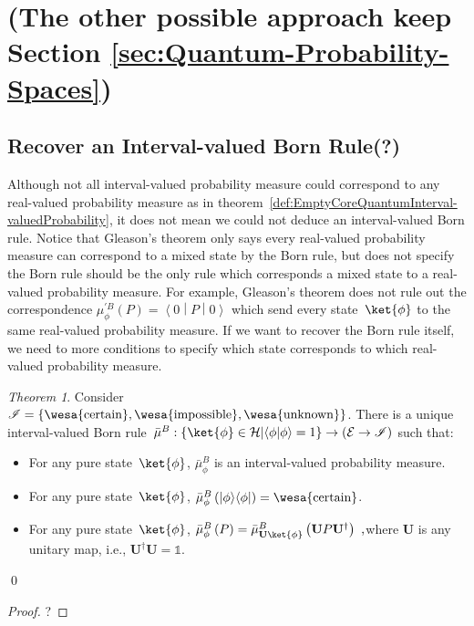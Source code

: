 \documentclass{article}
\theoremstyle{remark}
\newtheorem{thm}{Theorem}
\newcommand{\events}{\ensuremath{\mathcal{E}}}
\newcommand{\Hilb}{\mathcal{H}}
\newcommand{\imposs}{{\mbox{\wesa{impossible}}}}
\newcommand{\necess}{{\mbox{\wesa{certain}}}}
\newcommand{\unknown}{{\mbox{\wesa{unknown}}}}
\newcommand{\ip}[2]{\ensuremath{\left\langle{#1}\middle\vert{#2}\right\rangle}}
\newcommand{\melem}[3]{\ensuremath{\left\langle{#1}\middle\vert{#2}\middle\vert{#3}\right\rangle}}
\newcommand{\op}[2]{\ensuremath{\left\vert{#1}\middle\rangle\middle\langle{#2}\right\vert}}
\newcommand{\proj}[1]{\op{#1}{#1}}
\begin{document}
\section{(The other possible approach keep Section \ref{sec:Quantum-Probability-Spaces}) }



\subsection{Recover an Interval-valued Born Rule(?)}

Although not all interval-valued probability measure could correspond
to any real-valued probability measure as in theorem~\ref{def:EmptyCoreQuantumInterval-valuedProbability},
it does not mean we could not deduce an interval-valued Born rule.
Notice that Gleason's theorem only says every real-valued probability
measure can correspond to a mixed state by the Born rule, but does
not specify the Born rule should be the only rule which corresponds
a mixed state to a real-valued probability measure. For example, Gleason's
theorem does not rule out the correspondence $\mu_{\phi}^{\prime B}(P)=\melem{0}{P}{0}$
which send every state~$\ket{\phi}$ to the same real-valued probability
measure. If we want to recover the Born rule itself, we need to more
conditions to specify which state corresponds to which real-valued
probability measure.

\begin{thm}Consider\emph{ }$\mathscr{I}=\left\{ \necess,\imposs,\unknown\right\} $.
There is a unique interval-valued Born rule~$\bar{\mu}^{B}:\left\{ \ket{\phi}\in\Hilb\middle|\ip{\phi}{\phi}=1\right\} \rightarrow\left(\events\rightarrow\mathscr{I}\right)$
such that:
\begin{itemize}
\item For any pure state~$\ket{\phi}$, $\bar{\mu}_{\phi}^{B}$ is an interval-valued
probability measure.
\item For any pure state~$\ket{\phi}$, $\bar{\mu}_{\phi}^{B}\left(\proj{\phi}\right)=\necess$.
\item For any pure state~$\ket{\phi}$, $\bar{\mu}_{\phi}^{B}\left(P\right)=\bar{\mu}_{\mathbf{U}\ket{\phi}}^{B}\left(\mathbf{U}P\mathbf{U}^{\dagger}\right)\textrm{ ,}$where
$\mathbf{U}$ is any unitary map, i.e., $\mathbf{U}^{\dagger}\mathbf{U}=\mathbb{1}$. 
\end{itemize}
\qed\end{thm}
\begin{proof}
? 
\end{proof}
\end{document}
